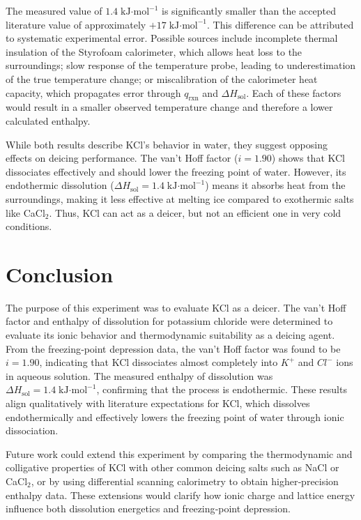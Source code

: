 \documentclass[11pt,letterpaper]{article}
\begin{document}
The measured value of $1.4\;\text{kJ·mol}^{-1}$ is significantly smaller than the accepted literature value of approximately $+17\;\text{kJ·mol}^{-1}$.\cite{ref4} This difference can be attributed to systematic experimental error. Possible sources include incomplete thermal insulation of the Styrofoam calorimeter, which allows heat loss to the surroundings; slow response of the temperature probe, leading to underestimation of the true temperature change; or miscalibration of the calorimeter heat capacity, which propagates error through $q_{\text{rxn}}$ and $\Delta H_{\text{sol}}$. Each of these factors would result in a smaller observed temperature change and therefore a lower calculated enthalpy.

While both results describe KCl’s behavior in water, they suggest opposing effects on deicing performance. The van’t Hoff factor ($i = 1.90$) shows that KCl dissociates effectively and should lower the freezing point of water. However, its endothermic dissolution ($\Delta H_{\text{sol}} = 1.4\;\text{kJ·mol}^{-1}$) means it absorbs heat from the surroundings, making it less effective at melting ice compared to exothermic salts like CaCl$_2$. Thus, KCl can act as a deicer, but not an efficient one in very cold conditions.

\section*{Conclusion}

The purpose of this experiment was to evaluate KCl as a deicer. The van’t Hoff factor and enthalpy of dissolution for potassium chloride were determined to evaluate its ionic behavior and thermodynamic suitability as a deicing agent. From the freezing‐point depression data, the van’t Hoff factor was found to be $i = 1.90$, indicating that KCl dissociates almost completely into $K^+$ and $Cl^-$ ions in aqueous solution. The measured enthalpy of dissolution was $\Delta H_{\text{sol}} = 1.4\;\text{kJ·mol}^{-1}$, confirming that the process is endothermic. These results align qualitatively with literature expectations for KCl, which dissolves endothermically and effectively lowers the freezing point of water through ionic dissociation.

Future work could extend this experiment by comparing the thermodynamic and colligative properties of KCl with other common deicing salts such as NaCl or CaCl$_2$, or by using differential scanning calorimetry to obtain higher‐precision enthalpy data. These extensions would clarify how ionic charge and lattice energy influence both dissolution energetics and freezing‐point depression.
\end{document}
